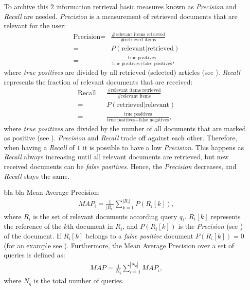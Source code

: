 To archive this $2$ information retrieval basic measures known as \textit{Precision} and \textit{Recall} are needed. \textit{Precision} is a measurement of retrieved documents that are relevant for the user:
\begin{align}
  \label{precision}
  \text{Precision} = & \frac{\text{\# relevant items retrieved}}{\text{\# retrieved items}} \nonumber \\
    = & P(\text{relevant} | \text{retrieved}) \nonumber \\
    = & \frac{\text{true positives}}{\text{true positives} + \text{false positives}},
\end{align}
where \textit{true positives} are divided by all retrieved (selected) articles (see ). \textit{Recall} represents the fraction of relevant documents that are received: 
\begin{align}
  \text{Recall} = & \frac{\text{\# relevant items retrieved}}{\text{\# relevant items}} \nonumber \\
    = & P(\text{retrieved} | \text{relevant}) \nonumber \\
    = & \frac{\text{true positives}}{\text{true positives} + \text{false negatives}},
\end{align}
where \textit{true positives} are divided by the number of all documents that are marked as positive (see ). \textit{Precision} and \textit{Recall} trade off against each other. Therefore, when having a \textit{Recall} of $1$ it is possible to have a low \textit{Precision}. This happens as \textit{Recall} always increasing until all relevant documents are retrieved, but new received documents can be \textit{false positives}. Hence, the \textit{Precision} decreases, and \textit{Recall} stays the same.

bla bla Mean Average Precision:
\begin{align}
  \label{map_of_a_single_query}
  \mathit{MAP}_i = \frac{1}{|R_i|}\sum_{k = 1}^{|R_i|} P(R_i[k]),
\end{align}
where $R_i$ is the set of relevant documents according query $q_i$. $R_i[k]$ represents the reference of the $k$th document in $R_i$, and $P(R_i[k])$ is the \textit{Precision} (see ) of the document. If $R_i[k]$ belongs to a \textit{false positive} document $P(R_i[k]) = 0$ (for an example see ). Furthermore, the Mean Average Precision over a set of queries is defined as:
\begin{align}
  \mathit{MAP} = \frac{1}{N_q}\sum_{i = 1}^{|N_q|} \mathit{MAP}_i,
\end{align}
where $N_q$ is the total number of queries.

